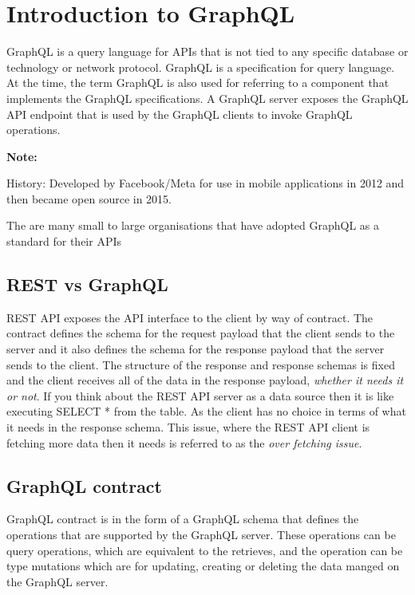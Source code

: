 \documentclass[a4paper, 11pt]{book}
\newenvironment{note}{
    \begin{siderule}
        \textbf{Note: }
        }{
    \end{siderule}
}
\begin{document}


    \section{Introduction to GraphQL}

    GraphQL is a query language for APIs that is not tied to any specific database or technology or network protocol.
    GraphQL is a specification for query language.
    At the time, the term GraphQL is also used for referring to a component that implements the GraphQL specifications.
    A GraphQL server exposes the GraphQL API endpoint that is used by the GraphQL clients to invoke GraphQL operations.

    \begin{note}
        History: Developed by Facebook/Meta for use in mobile applications in 2012 and then became open source in 2015.
    \end{note}

    The are many small to large organisations that have adopted GraphQL as a standard for their APIs

    \subsection{REST vs GraphQL}
    REST API exposes the API interface to the client by way of contract.
    The contract defines the schema for the request payload that the client sends to the server and it also defines the schema for the response payload that the server sends to the client.
    The structure of the response and response schemas is fixed and the client receives all of the data in the response payload, \textit{whether it needs it or not}.
    If you think about the REST API server as a data source then it is like executing SELECT * from the table.
    As the client has no choice in terms of what it needs in the response schema.
    This issue, where the REST API client is fetching more data then it needs is referred to as the \textit{over fetching issue}.

    \subsection{GraphQL contract}
    GraphQL contract is in the form of a GraphQL schema that defines the operations that are supported by the GraphQL server.
    These operations can be query operations, which are equivalent to the retrieves, and the operation can be type mutations which are for updating, creating or deleting the data manged on the GraphQL server.
\end{document}

